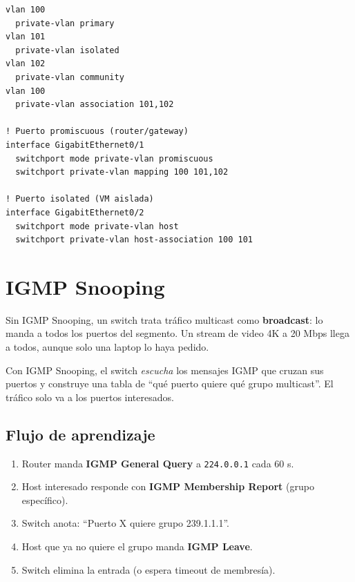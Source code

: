 \begin{codigo}
\begin{lstlisting}
vlan 100
  private-vlan primary
vlan 101
  private-vlan isolated
vlan 102
  private-vlan community
vlan 100
  private-vlan association 101,102

! Puerto promiscuous (router/gateway)
interface GigabitEthernet0/1
  switchport mode private-vlan promiscuous
  switchport private-vlan mapping 100 101,102

! Puerto isolated (VM aislada)
interface GigabitEthernet0/2
  switchport mode private-vlan host
  switchport private-vlan host-association 100 101
\end{lstlisting}
\end{codigo}

\section{ IGMP Snooping}

\begin{concepto}
Sin IGMP Snooping, un switch trata tráfico multicast como \textbf{broadcast}: lo manda
a todos los puertos del segmento. Un stream de video 4K a 20 Mbps llega a todos,
aunque solo una laptop lo haya pedido.

Con IGMP Snooping, el switch \emph{escucha} los mensajes IGMP que cruzan sus puertos
y construye una tabla de ``qué puerto quiere qué grupo multicast''. El tráfico
solo va a los puertos interesados.
\end{concepto}

\subsection{Flujo de aprendizaje}

\begin{enumerate}
    \item Router manda \textbf{IGMP General Query} a \texttt{224.0.0.1} cada 60 s.
    \item Host interesado responde con \textbf{IGMP Membership Report} (grupo específico).
    \item Switch anota: ``Puerto X quiere grupo 239.1.1.1''.
    \item Host que ya no quiere el grupo manda \textbf{IGMP Leave}.
    \item Switch elimina la entrada (o espera timeout de membresía).
\end{enumerate}

